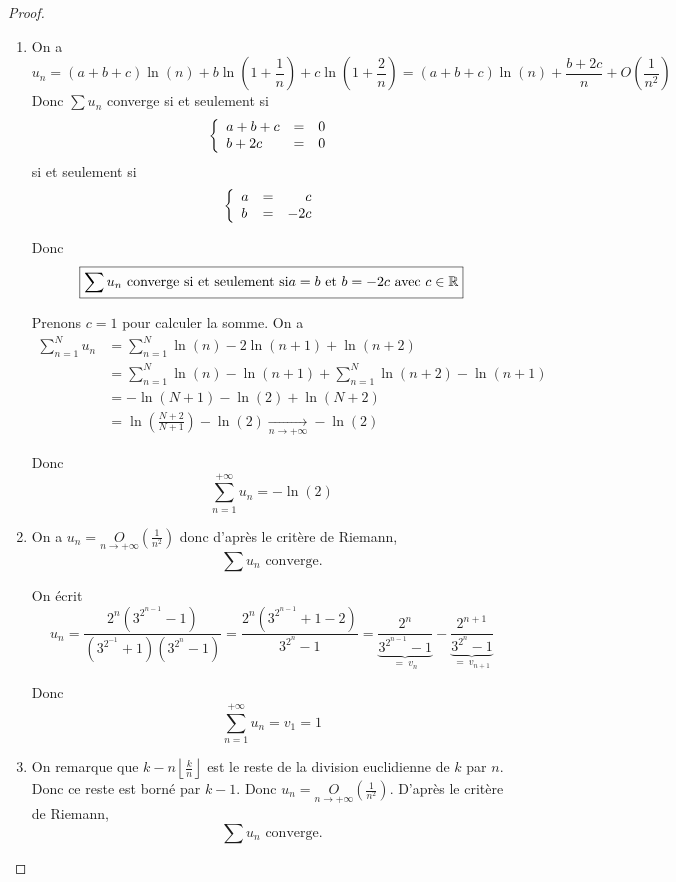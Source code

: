 \begin{proof}
	\phantom{}
	\begin{enumerate}
		\item On a 
		$$u_{n}=(a+b+c)\ln(n)+b\ln\left(1+\frac{1}{n}\right)+c\ln\left(1+\frac{2}{n}\right)=(a+b+c)\ln(n)+\frac{b+2c}{n}+O\left(\frac{1}{n^{2}}\right)$$
		Donc $\sum u_{n}$ converge si et seulement si 
		$$
		\left\{
			\begin{array}[]{lcr}
				a+b+c &= &0\\
				b+2c &= &0
			\end{array}
		\right.
		$$
		si et seulement si 
		$$
		\left\{
			\begin{array}[]{lcr}
				a &= &c\\
				b &= &-2c
			\end{array}
		\right.
		$$

		Donc 
		$$\boxed{\sum u_{n}\text{ converge si et seulement si} a=b\text{ et }b=-2c\text{ avec }c\in\mathbb{R}}$$

		Prenons $c=1$ pour calculer la somme. On a 
		\begin{align*}
			\sum_{n=1}^{N}u_{n}
			&=\sum_{n=1}^{N}\ln(n)-2\ln(n+1)+\ln(n+2)\\
			&=\sum_{n=1}^{N}\ln(n)-\ln(n+1)+\sum_{n=1}^{N}\ln(n+2)-\ln(n+1)\\
			&=-\ln(N+1)-\ln(2)+\ln(N+2)\\
			&=\ln\left(\frac{N+2}{N+1}\right)-\ln(2)\xrightarrow[n\to+\infty]{}-\ln(2)
		\end{align*}

		Donc 
		$$\boxed{\sum_{n=1}^{+\infty}u_{n}=-\ln(2)}$$

		\item On a $u_{n}=\underset{n\to+\infty}{O}\left(\frac{1}{n^{2}}\right)$ donc d'après le critère de Riemann,
		$$\boxed{\sum u_{n}\text{ converge.}}$$

		On écrit 
		$$u_{n}=\frac{2^{n}\left(3^{2^{n-1}}-1\right)}{\left(3^{2^{-1}}+1\right)\left(3^{2^{n}}-1\right)}=\frac{2^{n}\left(3^{2^{n-1}}+1-2\right)}{3^{2^{n}}-1}=\underbrace{\frac{2^{n}}{3^{2^{n-1}}-1}}_{=~v_{n}}-\underbrace{\frac{2^{n+1}}{3^{2^{n}}-1}}_{=~v_{n+1}}$$

		Donc 
		$$\boxed{\sum_{n=1}^{+\infty}u_{n}=v_{1}=1}$$

		\item On remarque que $k-n\left\lfloor\frac{k}{n}\right\rfloor$ est le reste de la division euclidienne de $k$ par $n$. Donc ce reste est borné par $k-1$. Donc $u_{n}=\underset{n\to+\infty}{O}\left(\frac{1}{n^{2}}\right)$. D'après le critère de Riemann,
		$$\boxed{\sum u_{n}\text{ converge.}}$$


\end{enumerate}
\end{proof}
